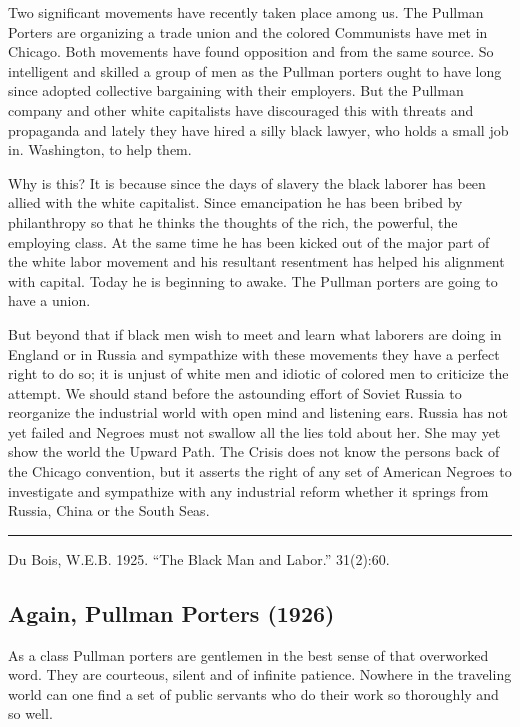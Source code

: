 \documentclass[letterpaper,10pt,english]{jupyterBook}
\begin{document}
\sphinxAtStartPar
Two significant movements have recently taken place among us. The Pullman Porters are organizing a trade union and the colored Communists have met in Chicago. Both movements have found opposition and from the same source. So intelligent and skilled a group of men as the Pullman porters ought to have long since adopted collective bargaining with their employers. But the Pullman company and other white capitalists have discouraged this with threats and propaganda and lately they have hired a silly black lawyer, who holds a small job in. Washington, to help them.

\sphinxAtStartPar
Why is this? It is because since the days of slavery the black laborer has been allied with the white capitalist. Since emancipation he has been bribed by philanthropy so that he thinks the thoughts of the rich, the powerful, the employing class. At the same time he has been kicked out of the major part of the white labor movement and his resultant resentment has helped his alignment with capital. Today he is beginning to awake. The Pullman porters are going to have a union.

\sphinxAtStartPar
But beyond that if black men wish to meet and learn what laborers are doing in England or in Russia and sympathize with these movements they have a perfect right to do so; it is unjust of white men and idiotic of colored men to criticize the attempt. We should stand before the astounding effort of Soviet Russia to reorganize the industrial world with open mind and listening ears. Russia has not yet failed and Negroes must not swallow all the lies told about her. She may yet show the world the Upward Path. The Crisis does not know the persons back of the Chicago convention, but it asserts the right of any set of American Negroes to investigate and sympathize with any industrial reform whether it springs from Russia, China or the South Seas.


\bigskip\hrule\bigskip


\sphinxAtStartPar
{} Du Bois, W.E.B. 1925. “The Black Man and Labor.”  31(2):60.


\subsection{Again, Pullman Porters (1926)}
\label{\detokenize{Volumes/31/06/again_pullman_porters:again-pullman-porters-1926}}\label{\detokenize{Volumes/31/06/again_pullman_porters::doc}}
\sphinxAtStartPar
As a class Pullman porters are gentlemen in the best sense of that overworked word. They are courteous, silent and of infinite patience. Nowhere in the traveling world can one find a set of public servants who do their work so thoroughly and so well.
\end{document}
